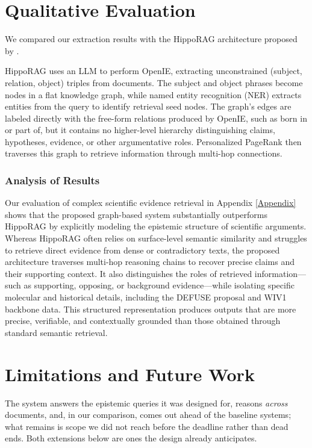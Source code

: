 \documentclass{article}
\begin{document}
\section{Qualitative Evaluation}

We compared our extraction results with the HippoRAG architecture proposed by \cite{gutierrez2025rag}. 

HippoRAG \cite{gutierrez2025rag} uses an LLM to perform OpenIE, extracting unconstrained (subject, relation, object) triples from documents. The subject and object phrases become nodes in a flat knowledge graph, while named entity recognition (NER) extracts entities from the query to identify retrieval seed nodes. The graph’s edges are labeled directly with the free-form relations produced by OpenIE, such as born in or part of, but it contains no higher-level hierarchy distinguishing claims, hypotheses, evidence, or other argumentative roles. Personalized PageRank then traverses this graph to retrieve information through multi-hop connections.





\subsubsection*{Analysis of Results}
Our evaluation of complex scientific evidence retrieval in Appendix \ref{Appendix} shows that the proposed graph-based system substantially outperforms HippoRAG by explicitly modeling the epistemic structure of scientific arguments. Whereas HippoRAG often relies on surface-level semantic similarity and struggles to retrieve direct evidence from dense or contradictory texts, the proposed architecture traverses multi-hop reasoning chains to recover precise claims and their supporting context. It also distinguishes the roles of retrieved information—such as supporting, opposing, or background evidence—while isolating specific molecular and historical details, including the DEFUSE proposal and WIV1 backbone data. This structured representation produces outputs that are more precise, verifiable, and contextually grounded than those obtained through standard semantic retrieval.

\section{Limitations and Future Work}
The system answers the epistemic queries it was designed for, reasons
\emph{across} documents, and, in our comparison, comes out ahead of the
baseline systems; what remains is scope we did not reach before the deadline
rather than dead ends. Both extensions below are ones the design already
anticipates.
\end{document}

